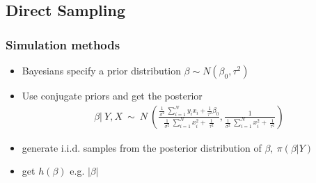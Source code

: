 \documentclass[
  shownotes,
  xcolor={svgnames},
  hyperref={colorlinks,citecolor=DarkBlue,linkcolor=DarkRed,urlcolor=DarkBlue}
  , aspectratio=169]{beamer}
\begin{document}
\subsection{Direct Sampling}
\begin{frame}[fragile]
\frametitle{Simulation methods}

\begin{itemize}

\item Bayesians specify a prior distribution $\beta \sim N( \beta_{0},  \tau^{2})$
\medskip
\item Use conjugate priors and get the posterior
\medskip
\begin{align}
\beta|\ Y,X\ \sim\ N\ \left(\frac{\frac{1}{\sigma^{2}}\ \sum_{i = 1}^{N}{y_{i}x_{i} + \frac{1}{\tau^{2}}\beta_{0}}}{\frac{1}{\sigma^{2}}\ \sum_{i = 1}^{N}{x_{i}^{2} + \ \frac{1}{\tau^{2}}}},\frac{1}{\frac{1}{\sigma^{2}}\ \sum_{i = 1}^{N}{x_{i}^{2} + \ \frac{1}{\tau^{2}}}}\right)
\end{align}

\item generate $\text{i.i.d.}$ samples from the posterior distribution of $\beta,\ \pi(\beta|Y)$
\item get $h(\beta)$ e.g. $|\beta|$

\end{itemize}
\end{frame}
\end{document}
